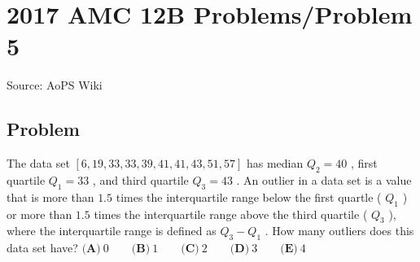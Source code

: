\documentclass[12pt]{article}
\begin{document}
\section*{{2017 AMC 12B Problems/Problem 5}}
Source: AoPS Wiki

\subsection*{Problem}
The data set $[6, 19, 33, 33, 39, 41, 41, 43, 51, 57]$ has median $Q_2 = 40$ , first quartile $Q_1 = 33$ , and third quartile $Q_3 = 43$ . An outlier in a data set is a value that is more than $1.5$ times the interquartile range below the first quartle ( $Q_1$ ) or more than $1.5$ times the interquartile range above the third quartile ( $Q_3$ ), where the interquartile range is defined as $Q_3 - Q_1$ . How many outliers does this data set have? $\textbf{(A)}\ 0\qquad\textbf{(B)}\ 1\qquad\textbf{(C)}\ 2\qquad\textbf{(D)}\ 3\qquad\textbf{(E)}\ 4$
\end{document}
